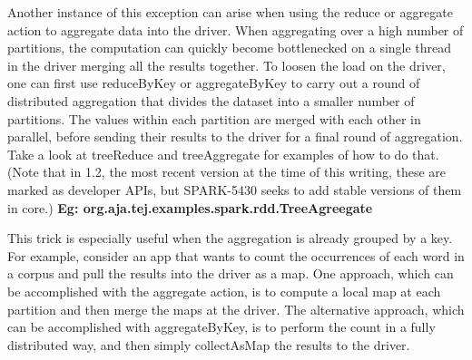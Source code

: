 Another instance of this exception can arise when using the reduce or aggregate action to aggregate data into the 
driver. When aggregating over a high number of partitions, the computation can quickly become bottlenecked on a single 
thread in the driver merging all the results together. To loosen the load on the driver, one can first use reduceByKey 
or aggregateByKey to carry out a round of distributed aggregation that divides the dataset into a smaller number of 
partitions. The values within each partition are merged with each other in parallel, before sending their results to 
the driver for a final round of aggregation. Take a look at treeReduce and treeAggregate for examples of how to do that. 
(Note that in 1.2, the most recent version at the time of this writing, these are marked as developer APIs, 
but SPARK-5430 seeks to add stable versions of them in core.)
\textbf{Eg: org.aja.tej.examples.spark.rdd.TreeAgreegate}

This trick is especially useful when the aggregation is already grouped by a key. For example, consider an app that 
wants to count the occurrences of each word in a corpus and pull the results into the driver as a map.  One approach, 
which can be accomplished with the aggregate action, is to compute a local map at each partition and then merge the 
maps at the driver. The alternative approach, which can be accomplished with aggregateByKey, is to perform the count 
in a fully distributed way, and then simply collectAsMap the results to the driver.